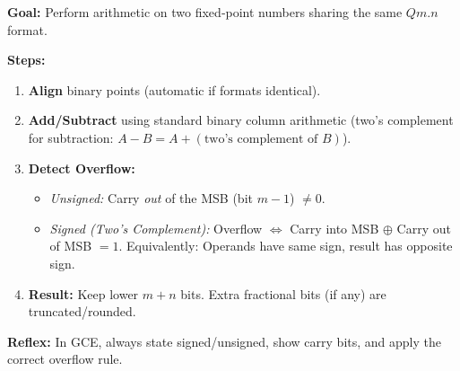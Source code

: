 \documentclass[11pt]{article}
\begin{document}
\begin{methode}
\textbf{Goal:} Perform arithmetic on two fixed‑point numbers sharing the same $Qm.n$ format.\par
\textbf{Steps:}
\begin{enumerate}
    \item \textbf{Align} binary points (automatic if formats identical).
    \item \textbf{Add/Subtract} using standard binary column arithmetic (two's complement for subtraction: $A-B = A + (\text{two's complement of } B)$).
    \item \textbf{Detect Overflow:}
          \begin{itemize}
              \item \emph{Unsigned:} Carry \emph{out} of the MSB (bit $m-1$) $\neq 0$.
              \item \emph{Signed (Two's Complement):} Overflow $\iff$ Carry into MSB $\oplus$ Carry out of MSB $= 1$. Equivalently: Operands have same sign, result has opposite sign.
          \end{itemize}
    \item \textbf{Result:} Keep lower $m+n$ bits. Extra fractional bits (if any) are truncated/rounded.
\end{enumerate}
\textbf{Reflex:} In GCE, always state signed/unsigned, show carry bits, and apply the correct overflow rule.
\end{methode}
\end{document}
